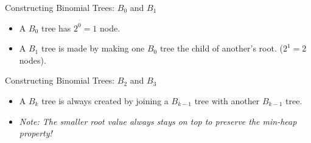 \documentclass[11pt, aspectratio=169]{beamer}
\newcommand{\treeBZero}[3]{
    \begin{scope}[shift={(#1,#2)}, every node/.style={#3}]
        \node (n1) at (0,0) {1};
    \end{scope}
}
\newcommand{\treeBTwo}[3]{
    \begin{scope}[shift={(#1,#2)}, every node/.style={#3}]
        \node (n1) at (0,0) {1}; \node (n3) at (0,-1) {3};
        \node (n2) at (-1,-1) {2}; \node (n4) at (-1,-2) {4};
        \draw[lnk] (n1)--(n3); \draw[lnk] (n1)--(n2); \draw[lnk] (n2)--(n4);
    \end{scope}
}
\newcommand{\treeBThree}[3]{
    \begin{scope}[shift={(#1,#2)}, every node/.style={#3}]
        \node (n1) at (0,0) {1}; \node (n5) at (0,-1) {5};
        \node (n3) at (-1,-1) {3}; \node (n7) at (-1,-2) {7};
        \node (n2) at (-2,-1) {2}; \node (n6) at (-2,-2) {6}; 
        \node (n4) at (-3,-2) {4}; \node (n8) at (-3,-3) {8};
        \draw[lnk] (n1)--(n5); \draw[lnk] (n1)--(n3); \draw[lnk] (n3)--(n7);
        \draw[lnk] (n1)--(n2); \draw[lnk] (n2)--(n6); \draw[lnk] (n2)--(n4); \draw[lnk] (n4)--(n8);
    \end{scope}
}
\begin{document}
\begin{frame}{Constructing Binomial Trees: $B_0$ and $B_1$}
    \begin{itemize}
        \item A $B_0$ tree has $2^0 = 1$ node.
        \item A $B_1$ tree is made by making one $B_0$ tree the child of another's root. ($2^1 = 2$ nodes).
    \end{itemize}
    \vspace{0.5cm}
    \begin{center}
    \end{center}
\end{frame}

\begin{frame}{Constructing Binomial Trees: $B_2$ and $B_3$}
    \begin{itemize}
        \item A $B_k$ tree is always created by joining a $B_{k-1}$ tree with another $B_{k-1}$ tree.
        \item \textit{Note: The smaller root value always stays on top to preserve the min-heap property!}
    \end{itemize}
    \vspace{0.2cm}
    \begin{center}
    \end{center}
\end{frame}
\end{document}
